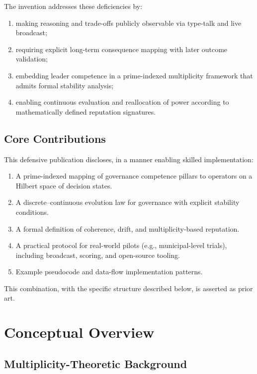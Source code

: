 \documentclass[11pt]{article}
\begin{document}
The invention addresses these deficiencies by:
\begin{enumerate}[leftmargin=1.5em]
    \item making reasoning and trade-offs publicly observable via type-talk and live broadcast;
    \item requiring explicit long-term consequence mapping with later outcome validation;
    \item embedding leader competence in a prime-indexed multiplicity framework that admits formal stability analysis;
    \item enabling continuous evaluation and reallocation of power according to mathematically defined reputation signatures.
\end{enumerate}

\subsection{Core Contributions}

This defensive publication discloses, in a manner enabling skilled implementation:

\begin{enumerate}[leftmargin=1.5em]
    \item A prime-indexed mapping of governance competence pillars to operators on a Hilbert space of decision states.
    \item A discrete--continuous evolution law for governance with explicit stability conditions.
    \item A formal definition of coherence, drift, and multiplicity-based reputation.
    \item A practical protocol for real-world pilots (e.g., municipal-level trials), including broadcast, scoring, and open-source tooling.
    \item Example pseudocode and data-flow implementation patterns.
\end{enumerate}

This combination, with the specific structure described below, is asserted as prior art.

\section{Conceptual Overview}

\subsection{Multiplicity-Theoretic Background}
\end{document}
